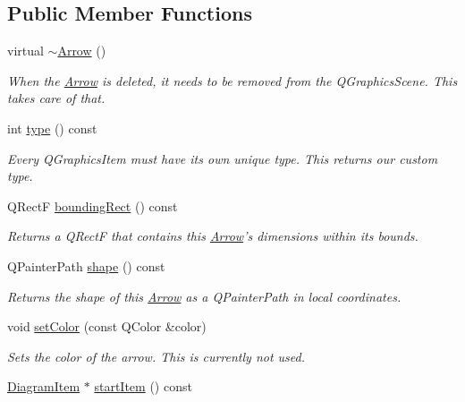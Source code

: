 \subsection*{Public Member Functions}
\begin{DoxyCompactItemize}
\item 
\hypertarget{class_arrow_a59ac428e67bd3a246138af049a62c0f3}{virtual \hyperlink{class_arrow_a59ac428e67bd3a246138af049a62c0f3}{$\sim$\-Arrow} ()}\label{class_arrow_a59ac428e67bd3a246138af049a62c0f3}

\begin{DoxyCompactList}\small\item\em When the \hyperlink{class_arrow}{Arrow} is deleted, it needs to be removed from the Q\-Graphics\-Scene. This takes care of that. \end{DoxyCompactList}\item 
int \hyperlink{class_arrow_aef6cfdb5dda88ef43c16b34cbd6a0b6f}{type} () const 
\begin{DoxyCompactList}\small\item\em Every Q\-Graphics\-Item must have its own unique type. This returns our custom type. \end{DoxyCompactList}\item 
\hypertarget{class_arrow_a3b15a4c7ab51e17ade465cb928ff5749}{Q\-Rect\-F \hyperlink{class_arrow_a3b15a4c7ab51e17ade465cb928ff5749}{bounding\-Rect} () const }\label{class_arrow_a3b15a4c7ab51e17ade465cb928ff5749}

\begin{DoxyCompactList}\small\item\em Returns a Q\-Rect\-F that contains this \hyperlink{class_arrow}{Arrow}'s dimensions within its bounds. \end{DoxyCompactList}\item 
Q\-Painter\-Path \hyperlink{class_arrow_aa51a558d21cfb6bb57578b9e6a745cf3}{shape} () const 
\begin{DoxyCompactList}\small\item\em Returns the shape of this \hyperlink{class_arrow}{Arrow} as a Q\-Painter\-Path in local coordinates. \end{DoxyCompactList}\item 
\hypertarget{class_arrow_ab7e7333a213b0eb310496b6f815e1824}{void \hyperlink{class_arrow_ab7e7333a213b0eb310496b6f815e1824}{set\-Color} (const Q\-Color \&color)}\label{class_arrow_ab7e7333a213b0eb310496b6f815e1824}

\begin{DoxyCompactList}\small\item\em Sets the color of the arrow. This is currently not used. \end{DoxyCompactList}\item 
\hypertarget{class_arrow_aca1c4bf8681a1449b8e09af3dac9b797}{\hyperlink{class_diagram_item}{Diagram\-Item} $\ast$ \hyperlink{class_arrow_aca1c4bf8681a1449b8e09af3dac9b797}{start\-Item} () const }\label{class_arrow_aca1c4bf8681a1449b8e09af3dac9b797}


\end{DoxyCompactItemize}
